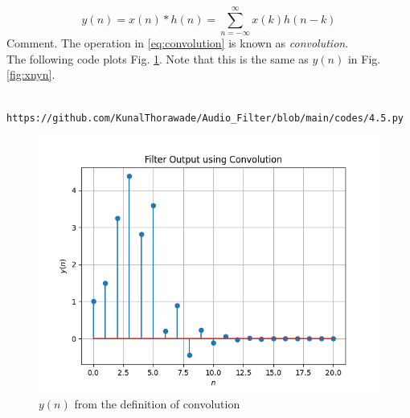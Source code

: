 \documentclass[journal,12pt,twocolumn]{IEEEtran}
\theoremstyle{remark}
\begin{document}
\begin{enumerate}[label=\thesection.\arabic*]
\begin{equation}
																																																							     y(n) = x(n)*h(n) = \sum_{n=-\infty}^{\infty}x(k)h(n-k)
																																																							     \end{equation}
																																																							     Comment. The operation in \eqref{eq:convolution} is known as
																																																							     {\em convolution}.
																																																							     \\
																																																							     \solution The following code plots Fig. \ref{fig:ynconv}. Note that this is the same as 
																																																							     $y(n)$ in  Fig. 
																																																							     \ref{fig:xnyn}. 
																																																							     \begin{lstlisting}
																																																							     https://github.com/KunalThorawade/Audio_Filter/blob/main/codes/4.5.py
																																																							     \end{lstlisting}
																																																							     \begin{figure}[H]
																																																							     \centering
																																																							     \includegraphics[width=\columnwidth]{figs/y_by_conv.png}
																																																							     \caption{$y(n)$ from the definition of convolution}
																																																							     \label{fig:ynconv}
																																																							     \end{figure}


\end{enumerate}
\end{document}
